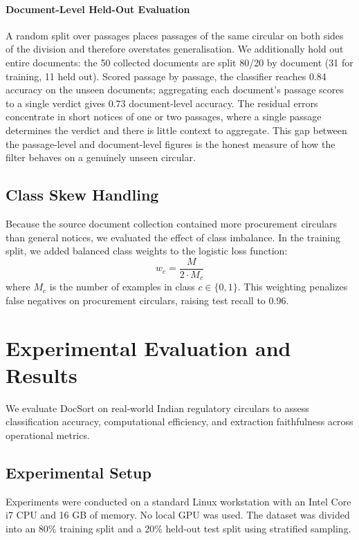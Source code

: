 \documentclass{article}
\begin{document}
\paragraph{Document-Level Held-Out Evaluation}
A random split over passages places passages of the same circular on both sides of the division and therefore overstates generalisation. We additionally hold out entire documents: the 50 collected documents are split 80/20 by document (31 for training, 11 held out). Scored passage by passage, the classifier reaches 0.84 accuracy on the unseen documents; aggregating each document's passage scores to a single verdict gives 0.73 document-level accuracy. The residual errors concentrate in short notices of one or two passages, where a single passage determines the verdict and there is little context to aggregate. This gap between the passage-level and document-level figures is the honest measure of how the filter behaves on a genuinely unseen circular.

\subsection{Class Skew Handling}
Because the source document collection contained more procurement circulars than general notices, we evaluated the effect of class imbalance. In the training split, we added balanced class weights to the logistic loss function:
\begin{equation}
    w_c = \frac{M}{2 \cdot M_c}
\end{equation}
where $M_c$ is the number of examples in class $c \in \{0, 1\}$. This weighting penalizes false negatives on procurement circulars, raising test recall to 0.96.

\section{Experimental Evaluation and Results}

We evaluate DocSort on real-world Indian regulatory circulars to assess classification accuracy, computational efficiency, and extraction faithfulness across operational metrics.

\subsection{Experimental Setup}
Experiments were conducted on a standard Linux workstation with an Intel Core i7 CPU and 16 GB of memory. No local GPU was used. The dataset was divided into an 80\% training split and a 20\% held-out test split using stratified sampling.
\end{document}
